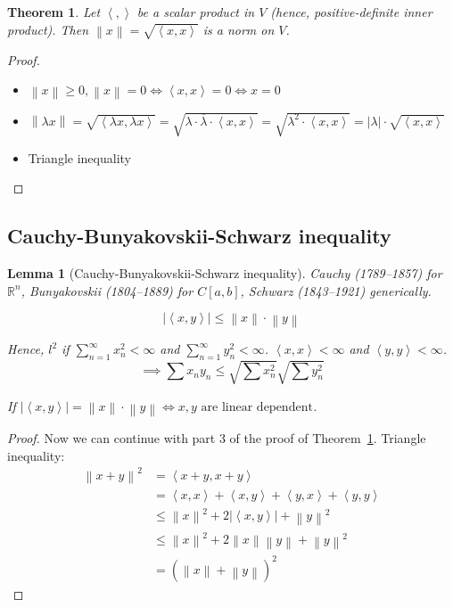 \documentclass{article}
\newtheorem{theorem}{Theorem}  \numberwithin{theorem}{section}
\newtheorem{lemma}{Lemma}  \numberwithin{lemma}{section}
\newcommand{\angel}[1]{\left\langle#1\right\rangle}
\newcommand{\norm}[1]{\left\|#1\right\|}
\newcommand{\card}[1]{\left|#1\right|}
\begin{document}
\begin{theorem} %
  \label{thm:t819}
  Let $\angel{,}$ be a scalar product in $V$ (hence, positive-definite inner product).
  Then $\norm{x} = \sqrt{\angel{x,x}}$ is a norm on $V$.
\end{theorem}

\begin{proof}
  \begin{itemize}
    \item $\norm{x} \geq 0, \norm{x} = 0 \iff \angel{x,x} = 0 \iff x = 0$
    \item $\norm{\lambda x} = \sqrt{\angel{\lambda x, \lambda x}} = \sqrt{\lambda \cdot \overline{\lambda} \cdot \angel{x,x}} = \sqrt{\lambda^2 \cdot \angel{x,x}} = \card{\lambda} \cdot \sqrt{\angel{x,x}}$
    \item Triangle inequality
  \end{itemize}
\end{proof}

\subsection{Cauchy-Bunyakovskii-Schwarz inequality}

\begin{lemma}[Cauchy-Bunyakovskii-Schwarz inequality] %
  \label{thm:cbs}
  Cauchy (1789--1857) for $\mathbb R^n$,
  Bunyakovskii (1804--1889) for $C[a,b]$,
  Schwarz (1843--1921) generically.

  \[ \card{\angel{x,y}} \leq \norm{x} \cdot \norm{y} \]

  Hence, $l^2$ if $\sum_{n=1}^\infty x_n^2 < \infty$ and $\sum_{n=1}^\infty y_n^2 < \infty$.
  $\angel{x,x} < \infty$ and $\angel{y,y} < \infty$.
  \[ \implies \sum x_n y_n \leq \sqrt{\sum x_n^2} \sqrt{\sum y_n^2} \]

  If $\card{\angel{x,y}} = \norm{x} \cdot \norm{y} \iff x,y \text{ are linear dependent}$.
\end{lemma}

\begin{proof}
  Now we can continue with part 3 of the proof of Theorem~\ref{thm:t819}.
  Triangle inequality:
  \begin{align*}
    \norm{x + y}^2 &= \angel{x + y, x + y} \\
      &= \angel{x,x} + \angel{x,y} + \angel{y,x} + \angel{y,y} \\
      &\leq \norm{x}^2 + 2 \card{\angel{x, y}} + \norm{y}^2 \\
      &\leq \norm{x}^2 + 2 \norm{x} \norm{y} + \norm{y}^2 \\
      &= \left(\norm x + \norm y\right)^2
  \end{align*}
\end{proof}
\end{document}
